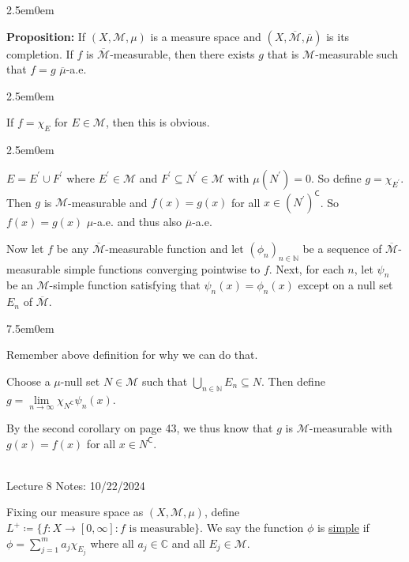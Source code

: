 \documentclass{book}
\newcommand{\hOne}{%
   \color{Black}%
   \fontsize{14}{16}\selectfont%
}
\newcommand{\hTwo}{%
\color{MidnightBlue}%
   \fontsize{13}{15}\selectfont%
}
\newcommand{\hThree}{%
   \color{PineGreen!85!Orange}
   \fontsize{12}{14}\selectfont%
}
\newcommand{\hFour}{%
   \color{Cyan!80!black}
   \fontsize{12}{14}\selectfont%
}
\newcommand{\myComment}{%
   \color{RawerSienna}%
   \fontsize{12}{14}\selectfont%
}
\newenvironment{myIndent}{%
   \begin{adjustwidth}{2.5em}{0em}%
}{%
   \end{adjustwidth}%
}
\newenvironment{myTindent}{%
   \begin{adjustwidth}{7.5em}{0em}%
}{%
   \end{adjustwidth}%
}
\newcommand{\udefine}[1]{{%
   \setulcolor{Red}%
   \setul{0.14em}{0.07em}%
   \ul{#1}%
}}
\newcommand{\blab}[1]{\textbf{#1}}
\newcommand{\comp}{\mathsf{C}}
\newcommand{\mySepTwo}[1][.]{%
   {\noindent\color{#1}{\rule{6.5in}{0.5mm}}}\\%
}
\newcommand{\retTwo}{\hfill\bigbreak}
\newcommand{\mHeader}[1]{{
   \color{Black}%
   \fontsize{20}{18}\selectfont%
   #1\retTwo
}}
\begin{document}
\hOne
\begin{myIndent}\hTwo
   \blab{Proposition:} If $(X, \mathcal{M}, \mu)$ is a measure space and $(X, \overline{\mathcal{M}}, \overline{\mu})$ is its completion. If $f$ is $\overline{\mathcal{M}}$-measurable, then there exists $g$ that is $\mathcal{M}$-measurable such that $f = g$ $\overline{\mu}$-a.e.

   \begin{myIndent}\hThree
      If $f = \chi_E$ for $E \in \mathcal{M}$, then this is obvious.
      \begin{myIndent}\hFour
         $E = E^\prime \cup F^\prime$ where $E^\prime \in \mathcal{M}$ and $F^\prime \subseteq N^\prime \in \mathcal{M}$ with $\mu(N^\prime) = 0$. So define $g = \chi_{E^\prime}$. Then $g$ is $\mathcal{M}$-measurable and $f(x) = g(x)$ for all $x \in (N^\prime)^\comp$. So $f(x) = g(x)$ $\mu$-a.e. and thus also $\overline{\mu}$-a.e.\retTwo
      \end{myIndent}

      Now let $f$ be any $\overline{\mathcal{M}}$-measurable function and let $(\phi_n)_{n\in\mathbb{N}}$ be a sequence of $\overline{\mathcal{M}}$-measurable simple functions converging pointwise to $f$. Next, for each $n$, let $\psi_n$ be an $\mathcal{M}$-simple function satisfying that $\psi_n(x) = \phi_n(x)$ except on a null set $E_n$ of $\overline{\mathcal{M}}$.
      
      \begin{myTindent}\myComment
         Remember above definition for why we can do that.\retTwo
      \end{myTindent}

      Choose a $\mu$-null set $N \in \mathcal{M}$ such that $\bigcup\limits_{n \in \mathbb{N}}E_n \subseteq N$. Then define $g = \lim\limits_{n \rightarrow \infty} \chi_{N^\comp}\psi_n(x)$.\retTwo

      By the second corollary on page 43, we thus know that $g$ is $\mathcal{M}$-measurable with $g(x) = f(x)$ for all $x \in N^\comp$.
   \end{myIndent}
\end{myIndent}

\mySepTwo

\mHeader{Lecture 8 Notes: 10/22/2024}

Fixing our measure space as $(X, \mathcal{M}, \mu)$, define $L^+ \coloneq \{f: X \to [0, \infty] : f \text{ is measurable}\}$. We say the function $\phi$ is \udefine{simple} if $\phi = \sum_{j=1}^m a_j \chi_{E_j}$ where all $a_j \in \mathbb{C}$ and all $E_j \in \mathcal{M}$.\retTwo
\end{document}
